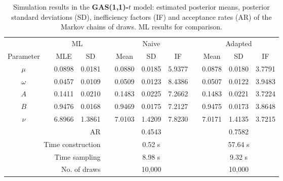 { \renewcommand{\arraystretch}{1.3} 
\begin{table}[h] 
\centering 
\caption{Simulation results in the \textbf{GAS(1,1)-$t$} model: estimated posterior means, posterior standard deviations (SD), inefficiency factors (IF) and acceptance rates (AR) of the Markov chains of draws. ML results for comparison.} 
\label{tab:posterior_t_gas} 
\begin{tabular}{cc rr c rrr c rrr}  
 & & \multicolumn{2}{c}{ML} & & \multicolumn{3}{c}{Naive} & & \multicolumn{3}{c}{Adapted} \\  \cline{3-4} \cline{6-8} \cline{10-12} 
 Parameter & &  \multicolumn{1}{c}{MLE} &  \multicolumn{1}{c}{SD}  & &  \multicolumn{1}{c}{Mean} &  \multicolumn{1}{c}{SD} &  \multicolumn{1}{c}{IF} & &  \multicolumn{1}{c}{Mean} &  \multicolumn{1}{c}{SD} &  \multicolumn{1}{c}{IF} \\ \cline{1-1}  \cline{3-4} \cline{6-8} \cline{10-12}  
$\mu$ & & 0.0898 &  0.0181 & & 0.0880 &  0.0185 &  5.9377 & & 0.0878 &  0.0180 &  3.7791 \\ [1ex] 
$\omega$ & & 0.0457 &  0.0109 & & 0.0509 &  0.0123 &  8.4386 & & 0.0507 &  0.0122 &  3.9483 \\ [1ex] 
$A$ & & 0.1411 &  0.0210 & & 0.1483 &  0.0225 &  7.2662 & & 0.1483 &  0.0221 &  3.7224 \\ [1ex] 
$B$ & & 0.9476 &  0.0168 & & 0.9469 &  0.0175 &  7.2127 & & 0.9475 &  0.0173 &  3.8648 \\ [1ex] 
$\nu$ & & 6.8966 &  1.3861 & & 7.0103 &  1.4209 &  7.8230 & & 7.0171 &  1.4135 &  3.7215 \\ [1ex] 
\cline{1-1}  \cline{3-4} \cline{6-8} \cline{10-12}   
\multicolumn{4}{r}{AR} & &\multicolumn{3}{c}{0.4543} &&\multicolumn{3}{c}{0.7582} \\ 
  \cline{1-4} \cline{6-8} \cline{10-12}  
 \multicolumn{4}{r}{Time construction} & &\multicolumn{3}{c}{0.52 s} &&\multicolumn{3}{c}{57.64 s} \\ 
   \multicolumn{4}{r}{Time sampling} & &\multicolumn{3}{c}{8.98 s} &&\multicolumn{3}{c}{9.32 s} \\ 
   \multicolumn{4}{r}{No. of draws }& &\multicolumn{3}{c}{10,000} &&\multicolumn{3}{c}{10,000} \\ 
  \cline{1-4} \cline{6-8} \cline{10-12} 
\hline 
\end{tabular} 
\end{table} 
} 

